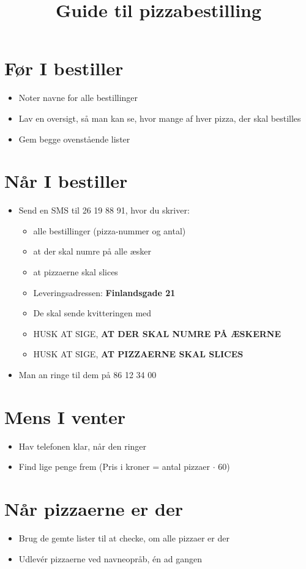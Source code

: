 \documentclass[a4paper,danish]{article}
\title{Guide til pizzabestilling}
\author{}
\date{}
\begin{document}
\maketitle

\section{Før I bestiller}
\begin{itemize}
  \item Noter navne for alle bestillinger
  \item Lav en oversigt, så man kan se, hvor mange af hver pizza, der skal bestilles
    \item Gem begge ovenstående lister
\end{itemize}
\section{Når I bestiller}
\begin{itemize}
  \item Send en SMS til 26 19 88 91, hvor du skriver:
    \begin{itemize}
      \item alle bestillinger (pizza-nummer og antal)
      \item at der skal numre på alle æsker
      \item at pizzaerne skal slices 
      \item Leveringsadressen: \textbf{Finlandsgade 21}
      \item De skal sende kvitteringen med
      \item HUSK AT SIGE, \textbf{AT DER SKAL NUMRE PÅ ÆSKERNE}
      \item HUSK AT SIGE, \textbf{AT PIZZAERNE SKAL SLICES} 
    \end{itemize}
  \item Man an ringe til dem på 86 12 34 00
\end{itemize}

\section{Mens I venter}
\begin{itemize}
  \item Hav telefonen klar, når den ringer
  \item Find lige penge frem (Pris i kroner = antal pizzaer $\cdot$ 60)
\end{itemize}

\section{Når pizzaerne er der}
\begin{itemize}
  \item Brug de gemte lister til at checke, om alle pizzaer er der
  \item Udlevér pizzaerne ved navneopråb, én ad gangen
\end{itemize}
\end{document}
